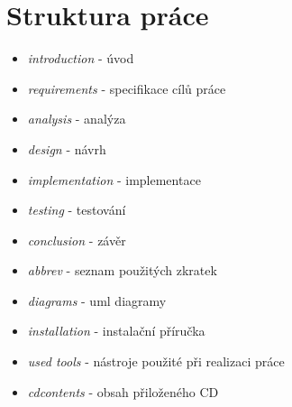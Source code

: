 \section{Struktura práce}
\begin{itemize}
\item \emph{introduction} - úvod
\item \emph{requirements} - specifikace cílů práce
\item \emph{analysis} - analýza
\item \emph{design} - návrh
\item \emph{implementation} - implementace
\item \emph{testing} - testování
\item \emph{conclusion} - závěr
\item \emph{abbrev} - seznam použitých zkratek
\item \emph{diagrams} - uml diagramy %
\item \emph{installation} - instalační příručka
\item \emph{used tools} - nástroje použité při realizaci práce
\item \emph{cdcontents} - obsah přiloženého CD
\end{itemize}
